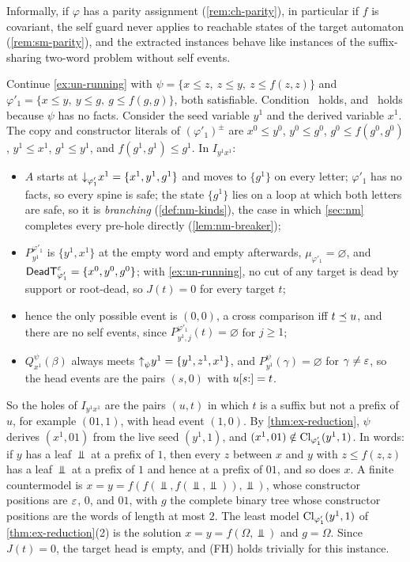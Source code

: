 \begin{remark}\label{rem:ex-covariant}
Informally, if $\varphi$ has a parity assignment (\cref{rem:ch-parity}), in
particular if $f$ is covariant, the self guard never applies to reachable
states of the target automaton (\cref{rem:sm-parity}), and the extracted
instances behave like instances of the suffix-sharing two-word problem
without self events.
\end{remark}

\begin{example}\label{ex:ex-running}
Continue \cref{ex:un-running} with $\psi=\{x\le z,\ z\le y,\ z\le f(z,z)\}$ and
$\varphi'_1=\{x\le y,\ y\le g,\ g\le f(g,g)\}$, both satisfiable. Condition
\CondU\ holds, and \CondI\ holds because $\psi$ has no facts.
Consider the seed variable $y^1$ and the derived variable $x^1$. The copy and
constructor literals of $(\varphi'_1)^\pm$ are $x^0\le y^0$, $y^0\le g^0$,
$g^0\le f(g^0,g^0)$, $y^1\le x^1$, $g^1\le y^1$, and $f(g^1,g^1)\le g^1$. In
$I_{y^1x^1}$:
\begin{itemize}[leftmargin=*]
\item $A$ starts at $\mathord{\downarrow}_{\varphi'_1}x^1=\{x^1,y^1,g^1\}$ and moves to
  $\{g^1\}$ on every letter; $\varphi'_1$ has no facts, so every spine
  is safe; the state $\{g^1\}$ lies on a loop at which both letters are safe,
  so it is \emph{branching} (\cref{def:nm-kinds}), the case in which
  \cref{sec:nm} completes every pre-hole directly (\cref{lem:nm-breaker});
\item $P^{\varphi'_1}_{y^1}$ is $\{y^1,x^1\}$ at the empty word and empty
  afterwards, $\mu_{\varphi'_1}=\varnothing$, and $\mathsf{DeadT}^\varepsilon_{\varphi'_1}=
  \{x^0,y^0,g^0\}$; with \cref{ex:un-running}, no cut of any target is dead by
  support or root-dead, so $J(t)=0$ for every target $t$;
\item hence the only possible event is $(0,0)$, a cross comparison iff
  $t\preceq u$, and there are no self events, since
  $P^{\varphi'_1}_{y^1,j}(t)=\varnothing$ for $j\ge1$;
\item $Q^\psi_{x^1}(\beta)$ always meets $\mathord{\uparrow}_{\psi} y^1=\{y^1,z^1,x^1\}$, and
  $P^\psi_{y^1}(\gamma)=\varnothing$ for $\gamma\ne\varepsilon$, so the head events
  are the pairs $(s,0)$ with $u[s{:}]=t$.
\end{itemize}
So the holes of $I_{y^1x^1}$ are the pairs $(u,t)$ in which $t$ is a suffix but
not a prefix of $u$, for example $(01,1)$, with head event $(1,0)$. By
\cref{thm:ex-reduction}, $\psi$ derives $(x^1,01)$ from the live seed
$(y^1,1)$, and $(x^1,01)\notin\operatorname{Cl}_{\varphi'_1}(y^1,1)$. In words: if $y$ has a
leaf $\Bot$ at a prefix of $1$, then every $z$ between $x$ and $y$ with
$z\le f(z,z)$ has a leaf $\Bot$ at a prefix of $1$ and hence at a prefix of
$01$, and so does $x$. A finite countermodel is
$x=y=f(f(\Bot,f(\Bot,\Bot)),\Bot)$, whose constructor positions are $\varepsilon$,
$0$, and $01$, with $g$ the complete binary tree whose constructor positions
are the words of length at most $2$. The least model $\operatorname{Cl}_{\varphi'_1}(y^1,1)$
of \cref{thm:ex-reduction}(2) is the solution $x=y=f(\Omega,\Bot)$ and
$g=\Omega$. Since $J(t)=0$, the target head is empty, and (FH) holds trivially
for this instance.
\end{example}

